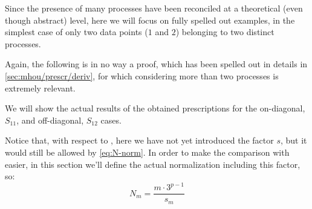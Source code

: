 Since the presence of many processes have been reconciled at a theoretical
(even though abstract) level, here we will focus on fully spelled out examples,
in the simplest case of only two data points ($1$ and $2$) belonging to two
distinct processes.

Again, the following is in no way a proof, which has been spelled out in
details in \cref{sec:mhou/prescr/deriv}, for which considering more than two processes is
extremely relevant.

We will show the actual results of the obtained prescriptions for the
on-diagonal, $S_{11}$, and off-diagonal, $S_{12}$ cases.

Notice that, with respect to \cite{NNPDF:2019ubu}, here we have not yet
introduced the factor $s$, but it would still be allowed by \cref{eq:N-norm}.
In order to make the comparison with \cite{NNPDF:2019ubu} easier, in this
section we'll define the actual normalization including this factor, so: 
\begin{equation}
    N_m = \frac{m \cdot 3^{p-1}}{s_m}
\end{equation}

